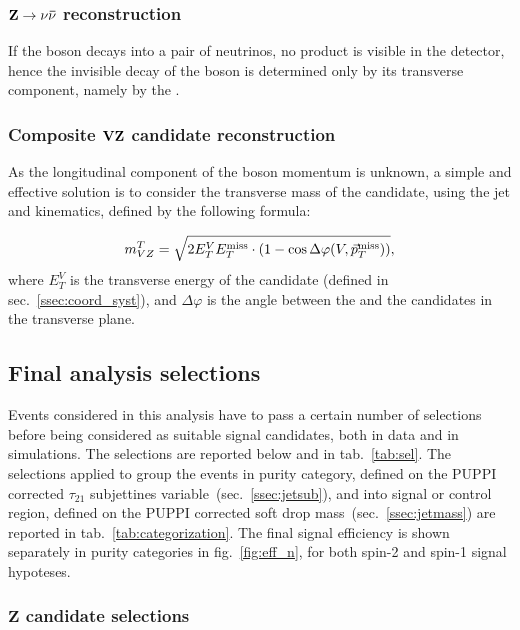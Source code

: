 \subsubsection{$\mathbf{Z \rightarrow \nu \bar{\nu} }$ reconstruction}
\label{ssec:Zcand}

If the \Z boson decays into a pair of neutrinos, no product is visible in the detector, hence the invisible decay of the \Z boson is determined only by its transverse component, namely by the \MET.

\subsubsection{Composite $\mathbf{VZ}$ candidate reconstruction}
\label{ssec:VZcand}

As the longitudinal component of the \Z boson momentum is unknown, a simple and effective solution is to consider the transverse mass of the \VZ candidate, using the jet and \met kinematics, defined by the following formula:

\begin{equation}
m_{VZ}^T = \sqrt{ 2 E_T^V E_T^{\text{miss}} \cdot (1 - \cos \Delta \varphi(V,\vec{p}_T^{\text{miss}})) },
\end{equation}
where $E_T^{V}$ is the transverse energy of the \V candidate (defined in sec.~\ref{ssec:coord_syst}), and $\Delta \varphi$ is the angle between the \V and the \Z candidates in the transverse plane.

\subsection{Final analysis selections}
\label{sec:selections}

Events considered in this analysis have to pass a certain number of selections before being considered as suitable signal candidates, both in data and in simulations. The selections are reported below and in tab.~\ref{tab:sel}. The selections applied to group the events in purity category, defined on the PUPPI corrected $\tau_{21}$ subjettines variable~(sec.~\ref{ssec:jetsub}), and into signal or control region, defined on the PUPPI corrected soft drop mass~(sec.~\ref{ssec:jetmass}) are reported in tab.~\ref{tab:categorization}. The final signal efficiency is shown separately in purity categories in fig.~\ref{fig:eff_n}, for both spin-2 and spin-1 signal hypoteses.

\subsubsection{$\mathbf{Z}$ candidate selections}

